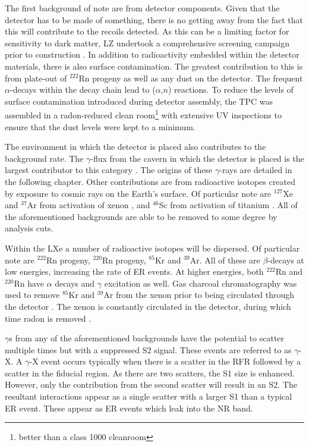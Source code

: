 \par
The first background of note are from detector components.
Given that the detector has to be made of something, there is no getting away from the fact that this will contribute to the recoils detected.
As this can be a limiting factor for sensitivity to dark matter, LZ undertook a comprehensive screening campaign prior to construction \cite{LZ_assay_ref}.
In addition to radioactivity embedded within the detector materials, there is also surface contamination.
The greatest contribution to this is from plate-out of ${}^{222}$Rn progeny as well as any dust on the detector.
The frequent $\alpha$-decays within the decay chain lead to ($\alpha$,$n$) reactions.
To reduce the levels of surface contamination introduced during detector assembly, the TPC was assembled in a radon-reduced clean room\footnote{better than a class 1000 cleanroom} with extensive UV inspections to ensure that the dust levels were kept to a minimum.

\par
The environment in which the detector is placed also contributes to the background rate.
The $\gamma$-flux from the cavern in which the detector is placed is the largest contributor to this category \cite{LZ_Gamma_Ray_Background_ref}.
The origins of these $\gamma$-rays are detailed in the following chapter.
Other contributions are from radioactive isotopes created by exposure to cosmic rays on the Earth's surface.
Of particular note are $^{127}$Xe and ${}^{37}$Ar from activation of xenon \cite{lux_xenon_activation_ref,lz_argon37_ref}, and $^{46}$Sc from activation of titanium \cite{LZ_TechnicalDesignReview_ref}.
All of the aforementioned backgrounds are able to be removed to some degree by analysis cuts.

\par
Within the LXe a number of radioactive isotopes will be dispersed.
Of particular note are $^{222}$Rn progeny, $^{220}$Rn progeny, $^{85}$Kr and $^{39}$Ar.
All of these are $\beta$-decays at low energies, increasing the rate of ER events.
At higher energies, both $^{222}$Rn and $^{220}$Rn have $\alpha$ decays and $\gamma$ excitation as well.
Gas charcoal chromatography was used to remove $^{85}$Kr and $^{39}$Ar from the xenon prior to being circulated through the detector \cite{xenon_prufication_chromatography_ref}.
The xenon is constantly circulated in the detector, during which time radon is removed \cite{marisarthurs_thesis_ref}.

\par
$\gamma$s from any of the aforementioned backgrounds have the potential to scatter multiple times but with a suppressed S2 signal.
These events are referred to as $\gamma$-X.
A $\gamma$-X event occurs typically when there is a scatter in the RFR followed by a scatter in the fiducial region.
As there are two scatters, the S1 size is enhanced.
However, only the contribution from the second scatter will result in an S2.
The resultant interactions appear as a single scatter with a larger S1 than a typical ER event.
These appear as ER events which leak into the NR band.


